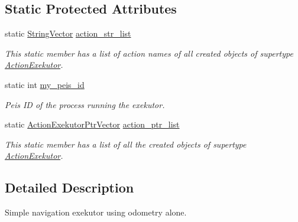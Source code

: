 \subsection*{\-Static \-Protected \-Attributes}
\begin{DoxyCompactItemize}
\item 
static \hyperlink{namespaceexekutor_a58d8a9cd227883a8eacb6400c9f62acb}{\-String\-Vector} \hyperlink{classexekutor_1_1ActionExekutor_a0dc39a7a2a3a67d2bdd366f9e6e682a2}{action\-\_\-str\-\_\-list}
\begin{DoxyCompactList}\small\item\em \-This static member has a list of action names of all created objects of supertype \hyperlink{classexekutor_1_1ActionExekutor}{\-Action\-Exekutor}. \end{DoxyCompactList}\item 
static int \hyperlink{classexekutor_1_1ActionExekutor_a31644a88e4d0166c2d3a70bab9eb5b99}{my\-\_\-peis\-\_\-id}
\begin{DoxyCompactList}\small\item\em \-Peis \-I\-D of the process running the exekutor. \end{DoxyCompactList}\item 
static \hyperlink{namespaceexekutor_a141a8f9a739e67ffb2356da18a653162}{\-Action\-Exekutor\-Ptr\-Vector} \hyperlink{classexekutor_1_1ActionExekutor_a73c4f2607b0725f5b201cf501cb42578}{action\-\_\-ptr\-\_\-list}
\begin{DoxyCompactList}\small\item\em \-This static member has a list of all the created objects of supertype \hyperlink{classexekutor_1_1ActionExekutor}{\-Action\-Exekutor}. \end{DoxyCompactList}\end{DoxyCompactItemize}


\subsection{\-Detailed \-Description}
\-Simple navigation exekutor using odometry alone. 

